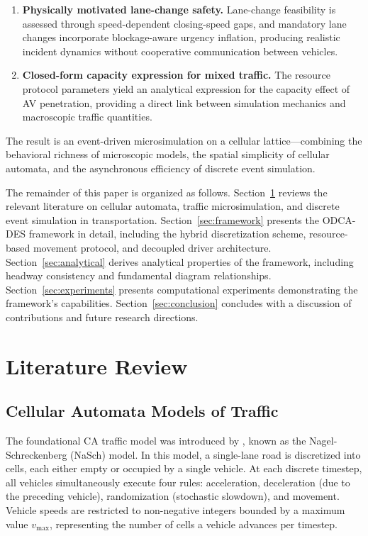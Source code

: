 \documentclass[review,authoryear]{elsarticle}
\begin{document}
\begin{enumerate}
    \item \textbf{Physically motivated lane-change safety.} Lane-change feasibility is assessed through speed-dependent closing-speed gaps, and mandatory lane changes incorporate blockage-aware urgency inflation, producing realistic incident dynamics without cooperative communication between vehicles.

    \item \textbf{Closed-form capacity expression for mixed traffic.} The resource protocol parameters yield an analytical expression for the capacity effect of AV penetration, providing a direct link between simulation mechanics and macroscopic traffic quantities.
\end{enumerate}

The result is an event-driven microsimulation on a cellular lattice---combining the behavioral richness of microscopic models, the spatial simplicity of cellular automata, and the asynchronous efficiency of discrete event simulation.

The remainder of this paper is organized as follows. Section~\ref{sec:literature} reviews the relevant literature on cellular automata, traffic microsimulation, and discrete event simulation in transportation. Section~\ref{sec:framework} presents the ODCA-DES framework in detail, including the hybrid discretization scheme, resource-based movement protocol, and decoupled driver architecture. Section~\ref{sec:analytical} derives analytical properties of the framework, including headway consistency and fundamental diagram relationships. Section~\ref{sec:experiments} presents computational experiments demonstrating the framework's capabilities. Section~\ref{sec:conclusion} concludes with a discussion of contributions and future research directions.


\section{Literature Review}
\label{sec:literature}

\subsection{Cellular Automata Models of Traffic}
\label{sec:lit_ca}

The foundational CA traffic model was introduced by \citet{nagel1992cellular}, known as the Nagel-Schreckenberg (NaSch) model. In this model, a single-lane road is discretized into cells, each either empty or occupied by a single vehicle. At each discrete timestep, all vehicles simultaneously execute four rules: acceleration, deceleration (due to the preceding vehicle), randomization (stochastic slowdown), and movement. Vehicle speeds are restricted to non-negative integers bounded by a maximum value $v_{\max}$, representing the number of cells a vehicle advances per timestep.
\end{document}
